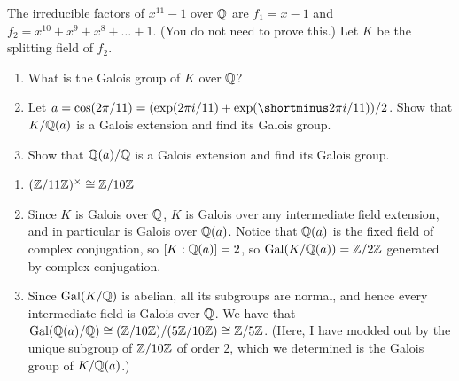 %
\begin{question}[subtitle = January 2024 Problem 2,ID=Jan24_2]
The irreducible factors of $x^{11}-1$ over $\mathbb{Q}$ are $f_1 = x-1$ and $f_2 = x^{10} + x^9 + x^8 + \dots + 1$. (You do not need to prove this.) Let $K$ be the splitting field of $f_2$.
\begin{enumerate}
    \item What is the Galois group of $K$ over $\mathbb{Q}$?
    \item Let $a = \cos(2\pi/11) = (\exp(2\pi i/11) + \exp(\shortminus 2\pi i/11))/2$. Show that $K/\mathbb{Q}(a)$ is a Galois extension and find its Galois group.
    \item Show that $\mathbb{Q}(a)/\mathbb{Q}$ is a Galois extension and find its Galois group.
\end{enumerate}
\end{question}
\begin{solution}
\begin{enumerate}
    \item $(\mathbb{Z}/11\mathbb{Z})^{\times} \cong \mathbb{Z}/10\mathbb{Z}$
    \item Since $K$ is Galois over $\mathbb{Q}$, $K$ is Galois over any intermediate field extension, and in particular is Galois over $\mathbb{Q}(a)$. Notice that $\mathbb{Q}(a)$ is the fixed field of complex conjugation, so $[K:\mathbb{Q}(a)] = 2$, so $\operatorname{Gal}(K/\mathbb{Q}(a)) = \mathbb{Z}/2\mathbb{Z}$ generated by complex conjugation.
    \item Since $\operatorname{Gal}(K/\mathbb{Q})$ is abelian, all its subgroups are normal, and hence every intermediate field is Galois over $\mathbb{Q}$. We have that $\operatorname{Gal}(\mathbb{Q}(a)/\mathbb{Q}) \cong (\mathbb{Z}/10\mathbb{Z}) / (5\mathbb{Z}/10\mathbb{Z}) \cong \mathbb{Z}/5\mathbb{Z}$. (Here, I have modded out by the unique subgroup of $\mathbb{Z}/10\mathbb{Z}$ of order 2, which we determined is the Galois group of $K/\mathbb{Q}(a)$.)
\end{enumerate}
\end{solution}

